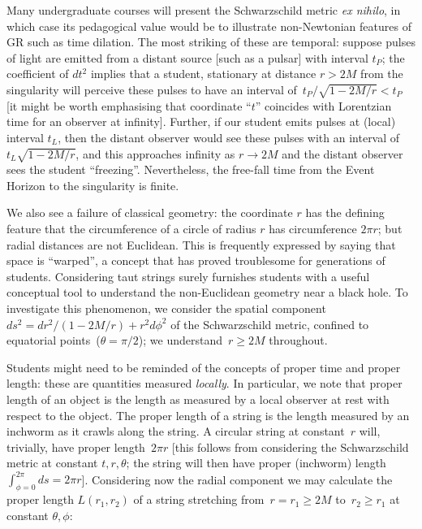 \documentclass[review]{elsarticle}
\begin{document}
Many undergraduate courses will present the Schwarzschild metric {\em
  ex nihilo}, in which case its pedagogical value would be to
illustrate non-Newtonian features of GR such as time dilation.  The
most striking of these are temporal: suppose pulses of light are
emitted from a distant source [such as a pulsar] with interval $t_P$;
the coefficient of $dt^2$ implies that a student, stationary at
distance $r>2M$ from the singularity will perceive these pulses to
have an interval of~$t_P/\sqrt{1-2M/r} < t_P$ [it might be worth
  emphasising that coordinate ``$t$'' coincides with Lorentzian time
  for an observer at infinity].  Further, if our student emits pulses
at (local) interval $t_L$, then the distant observer would see these
pulses with an interval of $t_L\sqrt{1-2M/r}$, and this approaches
infinity as $r\longrightarrow 2M$ and the distant observer sees the
student ``freezing''.  Nevertheless, the free-fall time from the Event
Horizon to the singularity is finite.

We also see a failure of classical geometry: the coordinate $r$ has
the defining feature that the circumference of a circle of radius $r$
has circumference $2\pi r$; but radial distances are not Euclidean.
This is frequently expressed by saying that space is ``warped'', a
concept that has proved troublesome for generations of students.
Considering taut strings surely furnishes students with a useful
conceptual tool to understand the non-Euclidean geometry near a black
hole.  To investigate this phenomenon, we consider the spatial
component~$ds^2= dr^2/\left(1-2M/r\right) + r^2d\phi^2$ of the
Schwarzschild metric, confined to equatorial points~($\theta=\pi/2$);
we understand~$r\geqslant 2M$ throughout.

Students might need to be reminded of the concepts of proper time and
proper length: these are quantities measured {\em locally}.  In
particular, we note that proper length of an object is the length as
measured by a local observer at rest with respect to the object.  The
proper length of a string is the length measured by an inchworm as it
crawls along the string.  A circular string at constant~$r$ will,
trivially, have proper length~$2\pi r$ [this follows from considering
  the Schwarzschild metric at constant $t,r,\theta$; the string will
  then have proper (inchworm) length $\int_{\phi=0}^{2\pi}ds=2\pi r$].
Considering now the radial component we may calculate the proper
length $L\left(r_1,r_2\right)$ of a string stretching
from~$r=r_1\geqslant 2M$ to~$r_2\geqslant r_1$ at constant
$\theta,\phi$:
\end{document}
